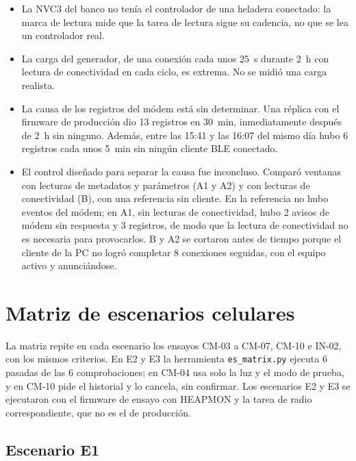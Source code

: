 \begin{itemize}
\item La NVC3 del banco no tenía el controlador de una heladera conectado: la marca de lectura mide que la tarea de lectura sigue su cadencia, no que se lea un controlador real.
\item La carga del generador, de una conexión cada unos 25~s durante 2~h con lectura de conectividad en cada ciclo, es extrema. No se midió una carga realista.
\item La causa de los registros del módem está sin determinar. Una réplica con el firmware de producción dio 13 registros en 30~min, inmediatamente después de 2~h sin ninguno. Además, entre las 15:41 y las 16:07 del mismo día hubo 6 registros cada unos 5~min sin ningún cliente BLE conectado.
\item El control diseñado para separar la causa fue inconcluso. Comparó ventanas con lecturas de metadatos y parámetros (A1 y A2) y con lecturas de conectividad (B), con una referencia sin cliente. En la referencia no hubo eventos del módem; en A1, sin lecturas de conectividad, hubo 2 avisos de módem sin respuesta y 3 registros, de modo que la lectura de conectividad no es necesaria para provocarlos. B y A2 se cortaron antes de tiempo porque el cliente de la PC no logró completar 8 conexiones seguidas, con el equipo activo y anunciándose.
\end{itemize}


\section{Matriz de escenarios celulares}
\label{sec:ensayos_escenarios}

La matriz repite en cada escenario los ensayos CM-03 a CM-07, CM-10 e IN-02, con los mismos criterios. En E2 y E3 la herramienta \texttt{es\_matrix.py} ejecuta 6 pasadas de las 6 comprobaciones; en CM-04 usa solo la luz y el modo de prueba, y en CM-10 pide el historial y lo cancela, sin confirmar. Los escenarios E2 y E3 se ejecutaron con el firmware de ensayo con HEAPMON y la tarea de radio correspondiente, que no es el de producción.

\subsection{Escenario E1}
\label{subsec:escenario_e1}

